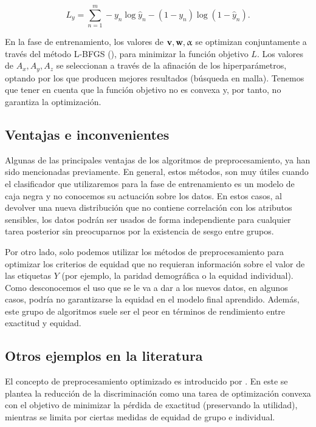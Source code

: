 \documentclass[oneside,openright,titlepage,numbers=noenddot,openany,headinclude,footinclude=true,
cleardoublepage=empty,abstractoff,BCOR=5mm,paper=a4,fontsize=12pt,main=spanish]{scrreprt}
\begin{document}
\begin{equation*}
L_y=\sum_{n=1}^m -y_n \log \hat{y}_n -(1-y_n) \log (1-\hat{y}_n).
\end{equation*}

En la fase de entrenamiento, los valores de $\textbf{v}, \textbf{w}, \upalpha$ se optimizan conjuntamente a través del método L-BFGS (\cite{lbfgs1997}), para minimizar la función objetivo $L$. Los valores de $A_x,A_y,A_z$ se seleccionan a través de la afinación de los hiperparámetros, optando por los que producen mejores resultados (búsqueda en malla). Tenemos que tener en cuenta que la función objetivo no es convexa y, por tanto, no garantiza la optimización.

\subsection*{Ventajas e inconvenientes}

Algunas de las principales ventajas de los algoritmos de preprocesamiento, ya han sido mencionadas previamente. En general, estos métodos, son muy útiles cuando el clasificador que utilizaremos para la fase de entrenamiento es un modelo de caja negra y no conocemos su actuación sobre los datos. En estos casos, al devolver una nueva distribución que no contiene correlación con los atributos sensibles, los datos podrán ser usados de forma independiente para cualquier tarea posterior sin preocuparnos por la existencia de sesgo entre grupos.

Por otro lado, solo podemos utilizar los métodos de preprocesamiento para optimizar los criterios de equidad que no requieran información sobre el valor de las etiquetas $Y$ (por ejemplo, la paridad demográfica o la equidad individual). Como desconocemos el uso que se le va a dar a los nuevos datos, en algunos casos, podría no garantizarse la equidad en el modelo final aprendido. Además, este grupo de algoritmos suele ser el peor en términos de rendimiento entre exactitud y equidad.


\subsection*{Otros ejemplos en la literatura}

El concepto de preprocesamiento optimizado es introducido por \cite{optimizeddata2017}. En este se plantea la reducción de la discriminación como una tarea de optimización convexa con el objetivo de minimizar la pérdida de exactitud (preservando la utilidad), mientras se limita por ciertas medidas de equidad de grupo e individual.
\end{document}
